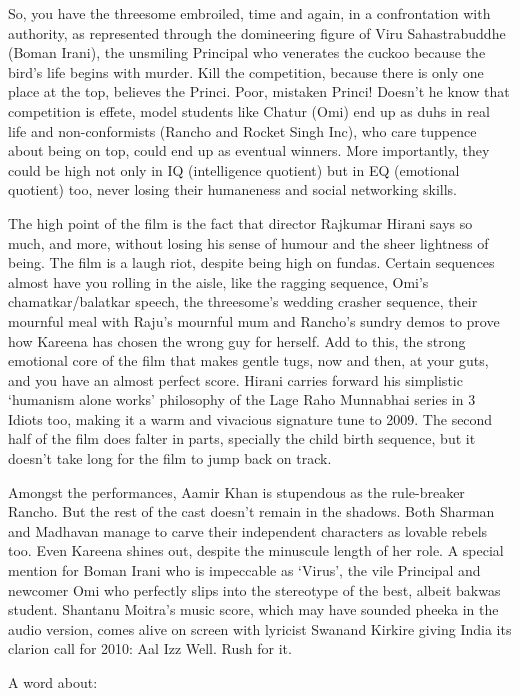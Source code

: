 \documentclass[11pt]{article}
\begin{document}
So, you have the threesome embroiled, time and again, in a confrontation with authority, as represented through the domineering figure of Viru Sahastrabuddhe (Boman Irani), the unsmiling Principal who venerates the cuckoo because the bird's life begins with murder. Kill the competition, because there is only one place at the top, believes the Princi. Poor, mistaken Princi! Doesn't he know that competition is effete, model students like Chatur (Omi) end up as duhs in real life and non-conformists (Rancho and Rocket Singh Inc), who care tuppence about being on top, could end up as eventual winners. More importantly, they could be high not only in IQ (intelligence quotient) but in EQ (emotional quotient) too, never losing their humaneness and social networking skills.

The high point of the film is the fact that director Rajkumar Hirani says so much, and more, without losing his sense of humour and the sheer lightness of being. The film is a laugh riot, despite being high on fundas. Certain sequences almost have you rolling in the aisle, like the ragging sequence, Omi's chamatkar/balatkar speech, the threesome's wedding crasher sequence, their mournful meal with Raju's mournful mum and Rancho's sundry demos to prove how Kareena has chosen the wrong guy for herself. Add to this, the strong emotional core of the film that makes gentle tugs, now and then, at your guts, and you have an almost perfect score. Hirani carries forward his simplistic `humanism alone works' philosophy of the Lage Raho Munnabhai series in 3 Idiots too, making it a warm and vivacious signature tune to 2009. The second half of the film does falter in parts, specially the child birth sequence, but it doesn't take long for the film to jump back on track.

Amongst the performances, Aamir Khan is stupendous as the rule-breaker Rancho. But the rest of the cast doesn't remain in the shadows. Both Sharman and Madhavan manage to carve their independent characters as lovable rebels too. Even Kareena shines out, despite the minuscule length of her role. A special mention for Boman Irani who is impeccable as `Virus', the vile Principal and newcomer Omi who perfectly slips into the stereotype of the best, albeit bakwas student. Shantanu Moitra's music score, which may have sounded pheeka in the audio version, comes alive on screen with lyricist Swanand Kirkire giving India its clarion call for 2010: Aal Izz Well. Rush for it.

A word about:
\end{document}

